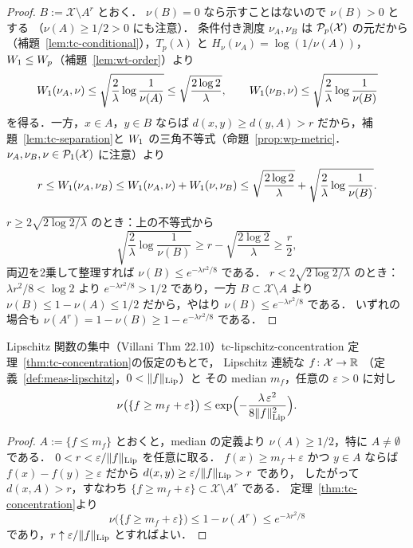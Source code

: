 \begin{proof}
  $B:=\mathcal{X}\setminus A^r$ とおく．
  $\nu(B)=0$ なら示すことはないので $\nu(B)>0$ とする
  （$\nu(A)\geq1/2>0$ にも注意）．
  条件付き測度 $\nu_A,\nu_B$ は $\mathcal{P}_{p}(\mathcal{X})$ の元だから
  （補題~\ref{lem:tc-conditional}），$T_p(\lambda)$ と
  $H_\nu(\nu_A)=\log(1/\nu(A))$，
  $W_1\leq W_p$（補題~\ref{lem:wt-order}）より
  \[
    W_1(\nu_A,\nu)\leq\sqrt{\frac{2}{\lambda}\log\frac{1}{\nu(A)}}
    \leq\sqrt{\frac{2\log2}{\lambda}},
    \qquad
    W_1(\nu_B,\nu)\leq\sqrt{\frac{2}{\lambda}\log\frac{1}{\nu(B)}}
  \]
  を得る．一方，$x\in A$，$y\in B$ ならば
  $d(x,y)\geq d(y,A)>r$ だから，補題~\ref{lem:tc-separation}と
  $W_1$ の三角不等式（命題~\ref{prop:wp-metric}．
  $\nu_A,\nu_B,\nu\in\mathcal{P}_{1}(\mathcal{X})$ に注意）より
  \[
    r\leq W_1(\nu_A,\nu_B)
    \leq W_1(\nu_A,\nu)+W_1(\nu,\nu_B)
    \leq\sqrt{\frac{2\log2}{\lambda}}
    +\sqrt{\frac{2}{\lambda}\log\frac{1}{\nu(B)}}.
  \]

  $r\geq2\sqrt{2\log2/\lambda}$ のとき：上の不等式から
  \[
    \sqrt{\frac{2}{\lambda}\log\frac{1}{\nu(B)}}
    \geq r-\sqrt{\frac{2\log2}{\lambda}}
    \geq\frac{r}{2},
  \]
  両辺を2乗して整理すれば
  $\nu(B)\leq e^{-\lambda r^2/8}$ である．
  $r<2\sqrt{2\log2/\lambda}$ のとき：$\lambda r^2/8<\log2$ より
  $e^{-\lambda r^2/8}>1/2$ であり，一方
  $B\subset\mathcal{X}\setminus A$ より
  $\nu(B)\leq1-\nu(A)\leq1/2$ だから，やはり
  $\nu(B)\leq e^{-\lambda r^2/8}$ である．
  いずれの場合も
  $\nu(A^r)=1-\nu(B)\geq1-e^{-\lambda r^2/8}$ である．
\end{proof}

\begin{corollary}{Lipschitz 関数の集中（Villani Thm 22.10）}{tc-lipschitz-concentration}
  定理~\ref{thm:tc-concentration}の仮定のもとで，
  Lipschitz 連続な $f\colon\mathcal{X}\to\mathbb{R}$
  （定義~\ref{def:meas-lipschitz}，$0<\lVert f \rVert_{\operatorname{Lip}}$）と
  その median $m_f$，任意の $\varepsilon>0$ に対し
  \[
    \nu\bigl(\{f\geq m_f+\varepsilon\}\bigr)
    \leq\exp\Bigl(-\frac{\lambda\,\varepsilon^2}
    {8\lVert f \rVert_{\operatorname{Lip}}^2}\Bigr).
  \]
\end{corollary}

\begin{proof}
  $A:=\{f\leq m_f\}$ とおくと，median の定義より
  $\nu(A)\geq1/2$，特に $A\neq\emptyset$ である．
  $0<r<\varepsilon/\lVert f \rVert_{\operatorname{Lip}}$ を任意に取る．
  $f(x)\geq m_f+\varepsilon$ かつ $y\in A$ ならば
  $f(x)-f(y)\geq\varepsilon$ だから
  $d(x,y)\geq\varepsilon/\lVert f \rVert_{\operatorname{Lip}}>r$ であり，
  したがって $d(x,A)>r$，すなわち
  $\{f\geq m_f+\varepsilon\}\subset\mathcal{X}\setminus A^r$ である．
  定理~\ref{thm:tc-concentration}より
  \[
    \nu\bigl(\{f\geq m_f+\varepsilon\}\bigr)
    \leq1-\nu(A^r)\leq e^{-\lambda r^2/8}
  \]
  であり，$r\uparrow\varepsilon/\lVert f \rVert_{\operatorname{Lip}}$ とすればよい．
\end{proof}

